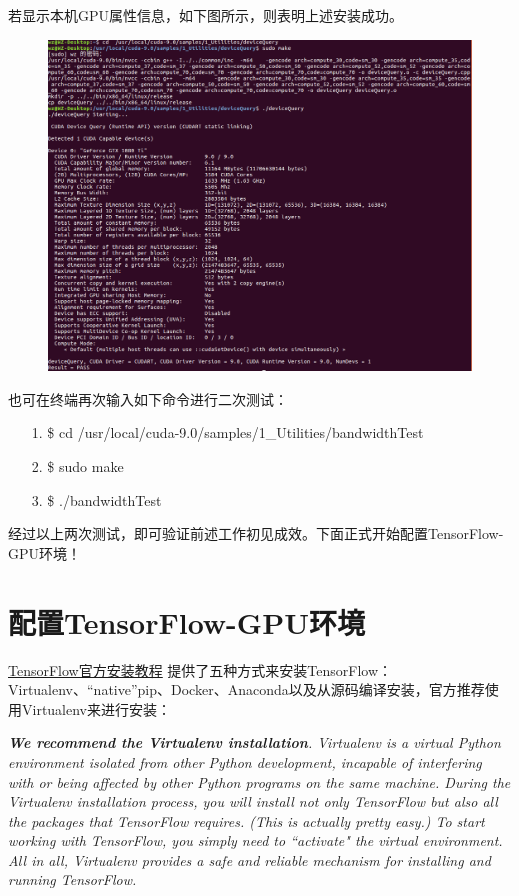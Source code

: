 \documentclass[11pt,a4paper]{ctexart}
\begin{document}
\newpage

若显示本机GPU属性信息，如下图所示，则表明上述安装成功。

\begin{figure}[h]
\begin{center}
\includegraphics[width=\textwidth]{test1} 
\end{center}
\end{figure}

\vspace{-0.2cm}
也可在终端再次输入如下命令进行二次测试：
\vspace{-0.2cm}
\begin{itemize}
\item[1.] \$ cd  /usr/local/cuda-9.0/samples/1\_Utilities/bandwidthTest
\item[2.] \$ sudo make
\item[3.] \$ ./bandwidthTest
\end{itemize}


经过以上两次测试，即可验证前述工作初见成效。下面正式开始配置TensorFlow-GPU环境！


\section{配置TensorFlow-GPU环境}
\href{https://www.tensorflow.org/install/install_linux}{TensorFlow官方安装教程}
提供了五种方式来安装TensorFlow：Virtualenv、“native”pip、Docker、Anaconda以及从源码编译安装，官方推荐使用Virtualenv来进行安装：

\emph{{\textbf {We recommend the Virtualenv installation}}. Virtualenv is a virtual Python environment isolated from other Python development, incapable of interfering with or being affected by other Python programs on the same machine. During the Virtualenv installation process, you will install not only TensorFlow but also all the packages that TensorFlow requires. (This is actually pretty easy.) To start working with TensorFlow, you simply need to ``activate" the virtual environment. All in all, Virtualenv provides a safe and reliable mechanism for installing and running TensorFlow.}
\end{document}
